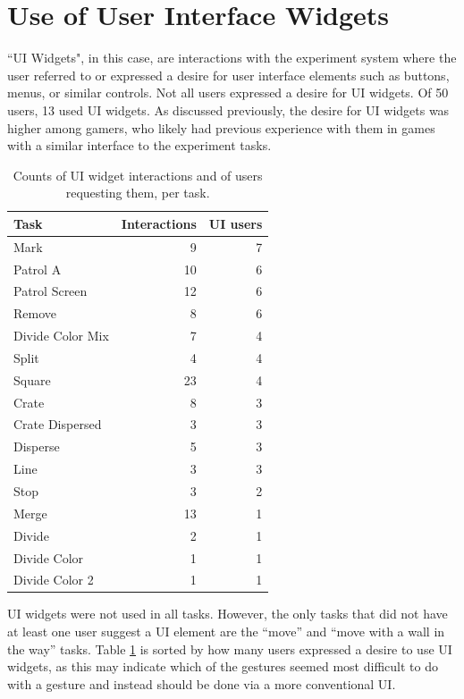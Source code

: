 \section{Use of User Interface Widgets}

``UI Widgets", in this case, are interactions with the experiment system where the user referred to or expressed a desire for user interface elements such as buttons, menus, or similar controls.
Not all users expressed a desire for UI widgets. 
Of 50 users, 13 used UI widgets. 
As discussed previously, the desire for UI widgets was higher among gamers, who likely had previous experience with them in games with a similar interface to the experiment tasks. 

\begin{table}
	\begin{tabular}{l r r}
		Task & Interactions & UI users \\
		\hline
		Mark & 9 & 7\\
		Patrol A & 10 & 6\\
		Patrol Screen & 12 & 6\\
		Remove & 8 & 6 \\
		Divide Color Mix & 7 & 4\\
		Split & 4 & 4 \\
		Square & 23 & 4 \\
		Crate & 8 & 3 \\
		Crate Dispersed & 3 & 3\\
		Disperse & 5 & 3\\
		Line & 3 & 3\\
		Stop & 3 & 2 \\
		Merge & 13 & 1\\
		Divide & 2 & 1\\
		Divide Color & 1 & 1\\
		Divide Color 2 & 1 & 1\\
		
	\end{tabular}
	\caption{Counts of UI widget interactions and of users requesting them, per task.}
	\label{tab:widget_counts_task}
\end{table}


UI widgets were not used in all tasks. 
However, the only tasks that did not have at least one user suggest a UI element are the ``move'' and ``move with a wall in the way'' tasks. 
Table \ref{tab:widget_counts_task} is sorted by how many users expressed a desire to use UI widgets, as this may indicate which of the gestures seemed most difficult to do with a gesture and instead should be done via a more conventional UI. 


